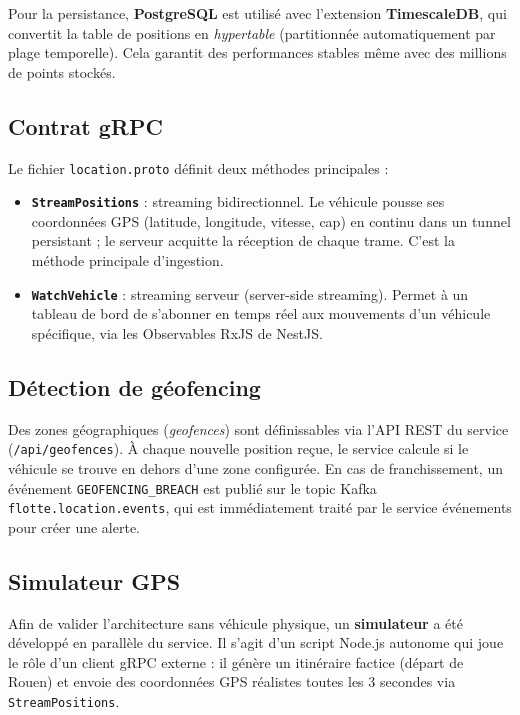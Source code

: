 \documentclass[12pt,a4paper]{article}
\begin{document}
Pour la persistance, \textbf{PostgreSQL} est utilis\'{e} avec l'extension \textbf{TimescaleDB}, qui convertit la table de positions en \textit{hypertable} (partitionn\'{e}e automatiquement par plage temporelle). Cela garantit des performances stables m\^{e}me avec des millions de points stock\'{e}s.

\subsection{Contrat gRPC}

Le fichier \texttt{location.proto} d\'{e}finit deux m\'{e}thodes principales :

\begin{itemize}[leftmargin=*]
  \item \textbf{\texttt{StreamPositions}} : streaming bidirectionnel. Le v\'{e}hicule pousse ses coordonn\'{e}es GPS (latitude, longitude, vitesse, cap) en continu dans un tunnel persistant ; le serveur acquitte la r\'{e}ception de chaque trame. C'est la m\'{e}thode principale d'ingestion.

  \item \textbf{\texttt{WatchVehicle}} : streaming serveur (server-side streaming). Permet \`{a} un tableau de bord de s'abonner en temps r\'{e}el aux mouvements d'un v\'{e}hicule sp\'{e}cifique, via les Observables RxJS de NestJS.
\end{itemize}

\subsection{D\'{e}tection de g\'{e}ofencing}

Des zones g\'{e}ographiques (\textit{geofences}) sont d\'{e}finissables via l'API REST du service (\texttt{/api/geofences}). \`{A} chaque nouvelle position re\c{c}ue, le service calcule si le v\'{e}hicule se trouve en dehors d'une zone configur\'{e}e. En cas de franchissement, un \'{e}v\'{e}nement \texttt{GEOFENCING\_BREACH} est publi\'{e} sur le topic Kafka \texttt{flotte.location.events}, qui est imm\'{e}diatement trait\'{e} par le service \'{e}v\'{e}nements pour cr\'{e}er une alerte.

\subsection{Simulateur GPS}

Afin de valider l'architecture sans v\'{e}hicule physique, un \textbf{simulateur} a \'{e}t\'{e} d\'{e}velopp\'{e} en parall\`{e}le du service. Il s'agit d'un script Node.js autonome qui joue le r\^{o}le d'un client gRPC externe : il g\'{e}n\`{e}re un itin\'{e}raire factice (d\'{e}part de Rouen) et envoie des coordonn\'{e}es GPS r\'{e}alistes toutes les 3 secondes via \texttt{StreamPositions}.
\end{document}
